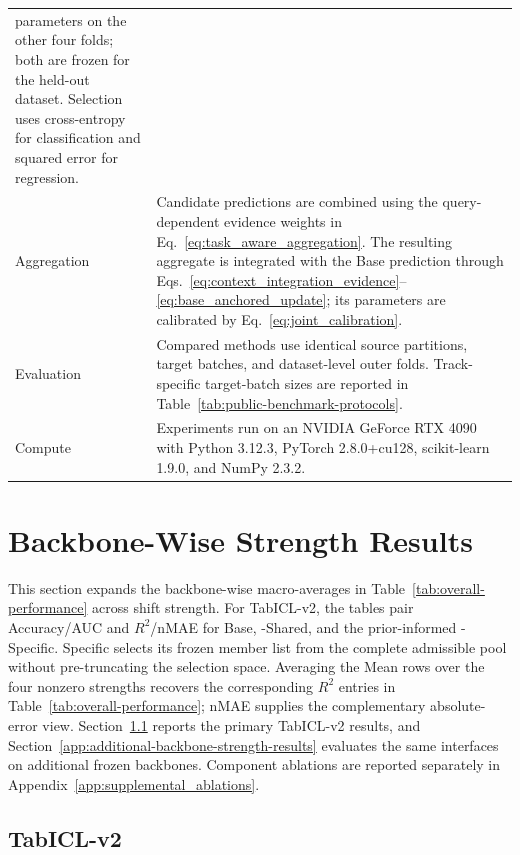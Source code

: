 \begin{longtable}{@{}>{\raggedright\arraybackslash}p{}
                      >{\raggedright\arraybackslash}p{}@{}}
        parameters on the other four folds; both are frozen for the held-out
        dataset. Selection uses cross-entropy for classification and squared
        error for regression. \\
    Aggregation
      & Candidate predictions are combined using the query-dependent evidence
        weights in Eq.~\eqref{eq:task_aware_aggregation}. The resulting
        aggregate is integrated with the Base prediction through
        Eqs.~\eqref{eq:context_integration_evidence}--\eqref{eq:base_anchored_update};
        its parameters are calibrated by Eq.~\eqref{eq:joint_calibration}. \\
    Evaluation
      & Compared methods use identical source partitions, target batches, and
        dataset-level outer folds. Track-specific target-batch sizes are reported
        in Table~\ref{tab:public-benchmark-protocols}. \\
    Compute
      & Experiments run on an NVIDIA GeForce RTX 4090 with Python 3.12.3,
        PyTorch 2.8.0+cu128, scikit-learn 1.9.0, and NumPy 2.3.2. \\
  \end{longtable}
\endgroup

\FloatBarrier
\section{Backbone-Wise Strength Results}
\label{app:backbone-strength-curves}

This section expands the backbone-wise macro-averages in
Table~\ref{tab:overall-performance} across shift strength. For TabICL-v2, the
tables pair Accuracy/AUC and $R^2$/nMAE for Base, \method{}-Shared, and the
prior-informed \method{}-Specific. Specific selects its frozen member list from
the complete admissible pool without pre-truncating the selection space. Averaging the
Mean rows over the four nonzero strengths recovers the corresponding $R^2$
entries in Table~\ref{tab:overall-performance}; nMAE supplies the complementary
absolute-error view.
Section~\ref{app:tabicl-strength-results} reports the primary TabICL-v2 results,
and Section~\ref{app:additional-backbone-strength-results} evaluates the same
interfaces on additional frozen backbones. Component ablations are reported
separately in Appendix~\ref{app:supplemental_ablations}.

\subsection{TabICL-v2}
\label{app:tabicl-strength-results}

